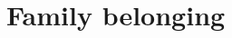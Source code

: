 \documentclass[paper=a4, fontsize=10pt]{article} %
\numberwithin{equation}{section} %
\numberwithin{figure}{section} %
\numberwithin{table}{section} %
\begin{document}




\section{\textbf{Family belonging}}

\end{document}
